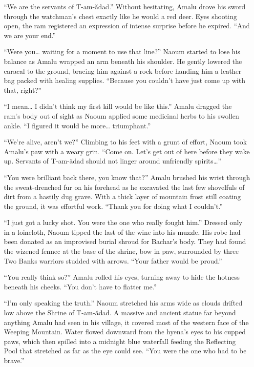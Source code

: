 ``We are the servants of T-am-ădad.'' Without hesitating, Amalu drove his sword through the watchman's chest exactly like he would a red deer. Eyes shooting open, the ram registered an expression of intense surprise before he expired. ``And we are your end.''

``Were you\ldots{} waiting for a moment to use that line?'' Naoum started to lose his balance as Amalu wrapped an arm beneath his shoulder. He gently lowered the caracal to the ground, bracing him against a rock before handing him a leather bag packed with healing supplies. ``Because you couldn't have just come up with that, right?''

``I mean\ldots{} I didn't think my first kill would be like this.'' Amalu dragged the ram's body out of sight as Naoum applied some medicinal herbs to his swollen ankle. ``I figured it would be more\ldots{} triumphant.''

``We're alive, aren't we?'' Climbing to his feet with a grunt of effort, Naoum took Amalu's paw with a weary grin. ``Come on. Let's get out of here before they wake up. Servants of T-am-ădad should not linger around unfriendly spirits\ldots''

\secdiv

\noindent ``You were brilliant back there, you know that?'' Amalu brushed his wrist through the sweat-drenched fur on his forehead as he excavated the last few shovelfuls of dirt from a hastily dug grave. With a thick layer of mountain frost still coating the ground, it was effortful work. ``Thank you for doing what I couldn't.''

``I just got a lucky shot. You were the one who really fought him.'' Dressed only in a loincloth, Naoum tipped the last of the wine into his muzzle. His robe had been donated as an improvised burial shroud for Bachar's body. They had found the wizened fennec at the base of the shrine, bow in paw, surrounded by three Two Banks warriors studded with arrows. ``Your father would be proud.''

``You really think so?'' Amalu rolled his eyes, turning away to hide the hotness beneath his cheeks. ``You don't have to flatter me.''

``I'm only speaking the truth.'' Naoum stretched his arms wide as clouds drifted low above the Shrine of T-am-ădad. A massive and ancient statue far beyond anything Amalu had seen in his village, it covered most of the western face of the Weeping Mountain. Water flowed downward from the hyena's eyes to his cupped paws, which then spilled into a midnight blue waterfall feeding the Reflecting Pool that stretched as far as the eye could see. ``You were the one who had to be brave.''


